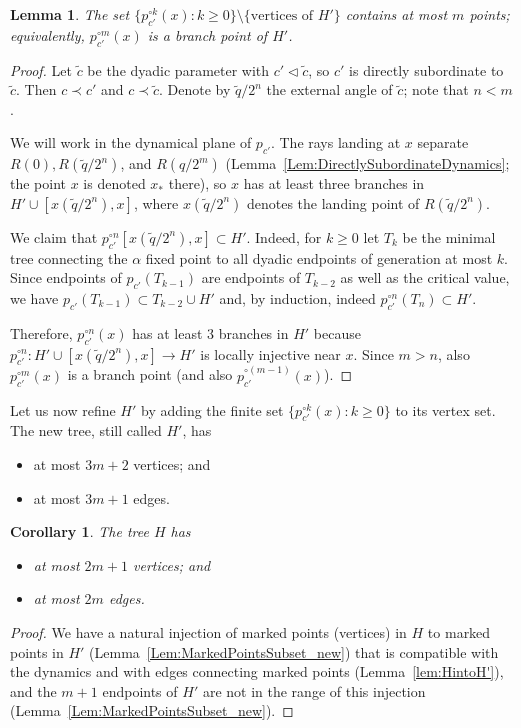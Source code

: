 \documentclass[12pt]{amsart}
\newcommand{\0}{\texttt{0}}
\newcommand{\1}{\texttt{1}}
\newtheorem{lemma}[theorem]{Lemma}
\newtheorem{corollary}[theorem]{Corollary}
\theoremstyle{definition}
\numberwithin{equation}{section}
\begin{document}
\begin{lemma}
The set $\{ p_{c'}^{\circ k}(x): k\ge 0\}\setminus \{\text{vertices of }H'\}$ contains at most $m$ points; equivalently, $p_{c'}^{\circ m}(x)$ is a branch point of $H'$.
\end{lemma}
\begin{proof}
Let $\tilde c$ be the dyadic parameter with $c'\lhd \tilde c$, so $c'$ is directly subordinate to $\tilde c$. Then $c\prec c'$ and $c\prec \tilde c$.
Denote by $\tilde q/ 2^n$ the external angle of $\tilde c$; note that $n<m$.

We will work in the dynamical plane of $p_{c'}$. 
The rays landing at $x$ separate $R(0), R(\tilde q/2^n)$, and $R(q/2^m)$ (Lemma~\ref{Lem:DirectlySubordinateDynamics}; the point $x$ is denoted $x_*$ there), so $x$ has at least three branches in $H'\cup [x(\tilde q/ 2^n),x]$, where $x(\tilde q/ 2^n)$ denotes the landing point of $R(\tilde q/ 2^n)$. 


We claim that $p_{c'}^{\circ n}[x(\tilde q/ 2^n),x]\subset H'$. 
Indeed, {for $k\ge 0$} let $T_k$ be the minimal tree connecting the $\alpha$ fixed point to all dyadic endpoints of generation at most $k$. Since endpoints of $p_{c'}(T_{k-1})$ are endpoints of $T_{k-2}$ as well as the critical value, we have $p_{c'}(T_{k-1})\subset T_{k-2}\cup H'$ and, by induction, indeed $p_{c'}^{\circ n}(T_{n})\subset H'$. 


Therefore, $p_{c'}^{\circ n}(x)$ has at least $3$ branches in $H'$ because $p_{c'}^{\circ n}:H' \cup [x(\tilde q/ 2^n),x]\to H'$ is locally injective near $x$. Since $m>n$, also $p_{c'}^{\circ m}(x)$ is a branch point (and also $p_{c'}^{\circ (m-1)}(x)$).
\end{proof} 


\goodbreak
  
Let us now refine $H'$ by adding the finite set $\{ p_{c'}^{\circ k}(x): k\ge 0\}$ to its vertex set. The new tree, still called $H'$, has 
\begin{itemize}
\item at most $3m+2$ vertices; and 
\item at most $3m+1$ edges.
 \end{itemize}  


\begin{corollary}
\label{cor:EdgesOfH}
 The tree $H$ has 
\begin{itemize}
\item at most $2m+1$ vertices; and 
\item at most $2m$ edges.
 \end{itemize}   
\end{corollary}
\begin{proof}
We have a natural injection of marked points (vertices) in $H$ to marked points in $H'$ (Lemma~\ref{Lem:MarkedPointsSubset_new}) that is compatible with the dynamics and with edges connecting marked points (Lemma~\ref{lem:HintoH'}), and the $m+1$ endpoints of $H'$ are not in the range of this injection (Lemma~\ref{Lem:MarkedPointsSubset_new}). 
\end{proof}
\end{document}
